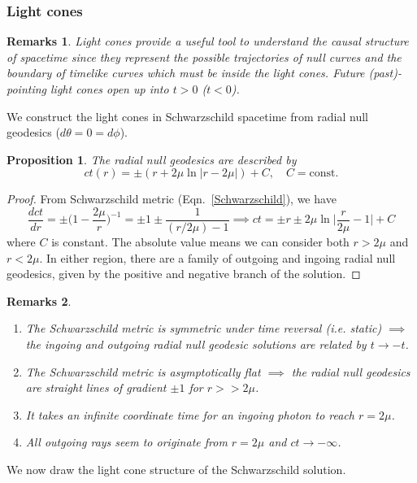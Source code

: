 \documentclass[a4paper]{article}
\newtheorem{remarks}{Remarks}[section]
\theoremstyle{new}
\newtheorem{prop}{Proposition}[section]
\begin{document}
\subsubsection{Light cones}
\begin{remarks}
Light cones provide a useful tool to understand the causal structure of spacetime since they represent the possible trajectories of null curves and the boundary of timelike curves which must be inside the light cones. Future (past)-pointing light cones open up into $t>0$ ($t<0$).
\end{remarks}
We construct the light cones in Schwarzschild spacetime from radial null geodesics ($d\theta=0=d\phi$).
\begin{prop}
The radial null geodesics are described by
\begin{equation}
    ct(r)=\pm(r+2\mu\ln|r-2\mu|)+C,\quad C=\text{const.}\label{radialnull}
\end{equation}
\end{prop}
\begin{proof}
From Schwarzschild metric (Eqn.~\ref{Schwarzschild}), we have
$$\frac{dct}{dr}=\pm\bigg(1-\frac{2\mu}{r}\bigg)^{-1}=\pm1\pm\frac{1}{(r/2\mu)-1}\implies ct=\pm r\pm2\mu\ln\bigg|\frac{r}{2\mu}-1\bigg|+C$$
where $C$ is constant. The absolute value means we can consider both $r>2\mu$ and $r<2\mu$. In either region, there are a family of outgoing and ingoing radial null geodesics, given by the positive and negative branch of the solution. 
\end{proof}
\begin{remarks}\leavevmode
\begin{enumerate}
    \item The Schwarzschild metric is symmetric under time reversal (i.e. static) $\implies$ the ingoing and outgoing radial null geodesic solutions are related by $t\rightarrow -t$.
    \item The Schwarzschild metric is asymptotically flat $\implies$ the radial null geodesics are straight lines of gradient $\pm1$ for $r>>2\mu$.
    \item It takes an infinite coordinate time for an ingoing photon to reach $r=2\mu$.
    \item All outgoing rays seem to originate from $r=2\mu$ and $ct\rightarrow-\infty$.
\end{enumerate}
\end{remarks}
We now draw the light cone structure of the Schwarzschild solution.
\end{document}

